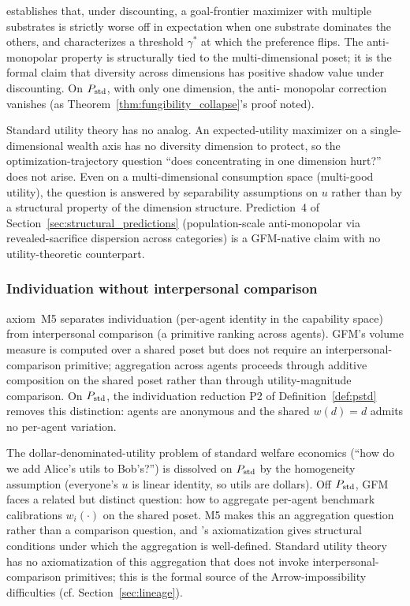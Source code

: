 \citep[Proposition~6]{lasser2026horizon} establishes that, under
discounting, a goal-frontier maximizer with multiple substrates is
strictly worse off in expectation when one substrate dominates the
others, and characterizes a threshold $\gamma^*$ at which the
preference flips.  The anti-monopolar property is structurally tied
to the multi-dimensional poset; it is the formal claim that
diversity across dimensions has positive shadow value under
discounting.  On $P_{\mathrm{std}}$, with only one dimension, the anti-
monopolar correction vanishes (as Theorem~\ref{thm:fungibility_collapse}'s
proof noted).

Standard utility theory has no analog.  An expected-utility maximizer
on a single-dimensional wealth axis has no diversity dimension to
protect, so the optimization-trajectory question ``does
concentrating in one dimension hurt?'' does not arise.  Even on a
multi-dimensional consumption space (multi-good utility), the
question is answered by separability assumptions on $u$ rather than
by a structural property of the dimension structure.  Prediction~4
of Section~\ref{sec:structural_predictions} (population-scale
anti-monopolar via revealed-sacrifice dispersion across
categories) is a GFM-native claim with no utility-theoretic
counterpart.

\subsubsection{Individuation without interpersonal comparison}

\citep[Proposition~1]{lasser2026poset} axiom~M5 separates
individuation (per-agent identity in the capability space) from
interpersonal comparison (a primitive ranking across agents).
GFM's volume measure is computed over a shared poset but does not
require an interpersonal-comparison primitive; aggregation across
agents proceeds through additive composition on the shared poset
rather than through utility-magnitude comparison.  On $P_{\mathrm{std}}$, the
individuation reduction P2 of Definition~\ref{def:pstd} removes
this distinction: agents are anonymous and the shared $w(d) = d$
admits no per-agent variation.

The dollar-denominated-utility problem of standard welfare
economics (``how do we add Alice's utils to Bob's?'') is dissolved
on $P_{\mathrm{std}}$ by the homogeneity assumption (everyone's $u$ is linear
identity, so utils are dollars).  Off $P_{\mathrm{std}}$, GFM faces a
related but distinct question: how to aggregate per-agent benchmark
calibrations $w_i(\cdot)$ on the shared poset.  M5 makes this an
aggregation question rather than a comparison question, and
\citep[Proposition~1]{lasser2026poset}'s axiomatization gives
structural conditions under which the aggregation is well-defined.
Standard utility theory has no axiomatization of this aggregation
that does not invoke interpersonal-comparison primitives; this is
the formal source of the Arrow-impossibility difficulties (cf.
Section~\ref{sec:lineage}).

